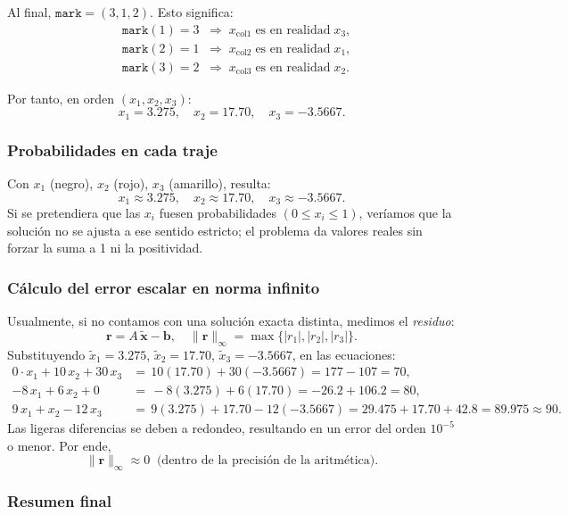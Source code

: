 Al final, \(\texttt{mark}=(3,1,2)\). Esto significa:
\[
\begin{aligned}
&\texttt{mark}(1)=3 \;\;\Rightarrow\; 
x_{\text{col1}}\;\text{es en realidad}\; x_3,\\
&\texttt{mark}(2)=1 \;\;\Rightarrow\; 
x_{\text{col2}}\;\text{es en realidad}\; x_1,\\
&\texttt{mark}(3)=2 \;\;\Rightarrow\; 
x_{\text{col3}}\;\text{es en realidad}\; x_2.
\end{aligned}
\]

Por tanto, en orden \((x_1,x_2,x_3)\):
\[
x_1 = 3.275,\quad
x_2 = 17.70,\quad
x_3 = -3.5667.
\]

\subsubsection{Probabilidades en cada traje}

Con \(x_1\) (negro), \(x_2\) (rojo), \(x_3\) (amarillo), resulta:
\[
\boxed{
x_1\approx 3.275,\quad
x_2\approx 17.70,\quad
x_3\approx -3.5667.
}
\]
Si se pretendiera que las \(x_i\) fuesen probabilidades \((0\le x_i\le1)\), veríamos que la solución no se ajusta a ese sentido estricto; el problema da valores reales sin forzar la suma a 1 ni la positividad.

\subsubsection{Cálculo del error escalar en norma infinito}

Usualmente, si no contamos con una solución exacta distinta, medimos el \emph{residuo}:
\[
\mathbf{r}=A\,\tilde{\mathbf{x}}-\mathbf{b},
\quad
\|\mathbf{r}\|_\infty=\max\{|r_1|,|r_2|,|r_3|\}.
\]
Substituyendo \(\tilde{x}_1=3.275\), \(\tilde{x}_2=17.70\), \(\tilde{x}_3=-3.5667\), en las ecuaciones:
\[
\begin{aligned}
0\cdot x_1 +10\,x_2 +30\,x_3 &=\,10(17.70)+30(-3.5667)=177-107=70,\\
-8\,x_1 +6\,x_2 +0 &=\,-8(3.275)+6(17.70)= -26.2 +106.2=80,\\
9\,x_1 + x_2 -12\,x_3 &=\,9(3.275) + 17.70 -12(-3.5667)=29.475+17.70+42.8=89.975\approx90.
\end{aligned}
\]
Las ligeras diferencias se deben a redondeo, resultando en un error del orden \(10^{-5}\) o menor. Por ende,
\[
\boxed{\|\mathbf{r}\|_\infty \approx 0\;\;\text{(dentro de la precisión de la aritmética)}.}
\]

\subsubsection{Resumen final}

